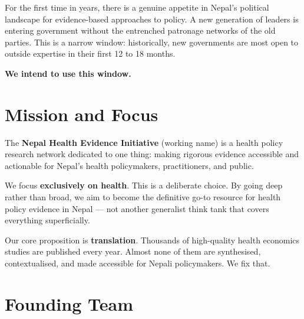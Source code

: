 \documentclass[11pt, a4paper]{article}
\begin{document}
For the first time in years, there is a genuine appetite in Nepal's political landscape for evidence-based approaches to policy. A new generation of leaders is entering government without the entrenched patronage networks of the old parties. This is a narrow window: historically, new governments are most open to outside expertise in their first 12 to 18 months.

\begin{callout}
\textbf{We intend to use this window.}
\end{callout}

\section{Mission and Focus}

The \textbf{Nepal Health Evidence Initiative} (working name) is a health policy research network dedicated to one thing: making rigorous evidence accessible and actionable for Nepal's health policymakers, practitioners, and public.

We focus \textbf{exclusively on health}. This is a deliberate choice. By going deep rather than broad, we aim to become the definitive go-to resource for health policy evidence in Nepal --- not another generalist think tank that covers everything superficially.

Our core proposition is \textbf{translation}. Thousands of high-quality health economics studies are published every year. Almost none of them are synthesised, contextualised, and made accessible for Nepali policymakers. We fix that.

\section{Founding Team}
\end{document}
